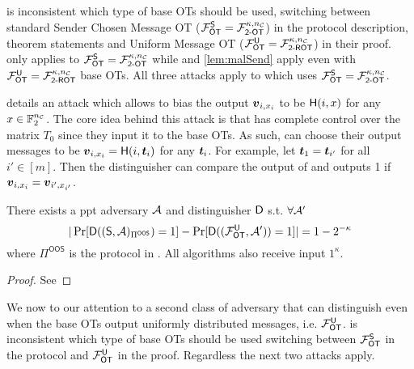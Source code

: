 \iffullversion
\begin{remark}\label{remark:oosROT}
	\cite{RSA:OrrOrsSch17} is inconsistent which type of base OTs should be used, switching between standard Sender Chosen Message OT ($\OOT^\send=\mathcal{F}^{\kappa,\nc}_{\textsf{2-OT}}$) in the protocol description, theorem statements and Uniform Message OT ($\OOT^\U=\mathcal{F}^{\kappa,\nc}_{\textsf{2-ROT}}$) in their proof.  only applies to $\OOT^\send=\mathcal{F}^{\kappa,\nc}_{\textsf{2-OT}}$ while  and \ref{lem:malSend} apply even with $\OOT^\U=\mathcal{F}^{\kappa,\nc}_{\textsf{2-ROT}}$ base OTs. All three attacks apply to \cite{C:KelOrsSch15} which uses $\OOT^\send=\mathcal{F}^{\kappa,\nc}_{\textsf{2-OT}}$.
\end{remark}
\fi


 details an attack which allows \R to bias the output $\vv_{i,x_i}$ to be $\H(i,x)$ for any $x\in\mathbb{F}^{\nc}_2$. The core idea behind this attack is that \rec has complete control over the matrix $T_0$ since they input it to the base OTs. As such, \rec can choose their output messages to be $\vv_{i,x_i}=\H(i,\tt_i)$ for any $\tt_i$. For example, let $\tt_1=\tt_{i'}$ for all $i'\in[m]$. Then the distinguisher can compare the output of \send and  outputs 1 if $\vv_{i,x_i}=\vv_{i',x_{i'}}$. 


\begin{lemma} \label{lem:malRec}
	There exists a ppt adversary $\Adv$ and distinguisher $\D$ s.t. $\forall\Adv'$ 
	$$
	|\Pr[\D((\send, \Adv)_{\Pi^{\textsf{OOS}}})=1]-\Pr[\D((\OOT^{\U}, \Adv'))=1]|=1-2^{-\kappa}
	$$
	where $\Pi^{\textsf{OOS}}$ is the protocol in . All algorithms also receive input $1^\kappa$. 
\end{lemma}
\iffullversion

\else
\begin{proof}
	See 
	\pe
\end{proof}
\fi




We now to our attention to a second class of adversary that can distinguish even when the base OTs output uniformly distributed messages, i.e. $\OOT^\U$. %
\cite{RSA:OrrOrsSch17} is inconsistent which type of base OTs should be used switching between $\OOT^\send$ in the protocol and $\OOT^\U$ in the proof. Regardless the next two attacks apply. 

